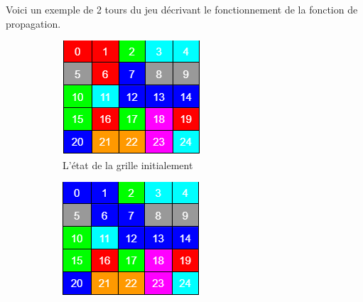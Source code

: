 \documentclass[11pt]{article}
\begin{document}
Voici un exemple de 2 tours du jeu décrivant le fonctionnement de la fonction de propagation. 
\begin{figure}[htp]

\begin{subfigure}{0.3\columnwidth}
\centering
\includegraphics[width=\textwidth]{img/iteration1.PNG}
\caption{L'état de la grille initialement}
\label{fig:time1}
\end{subfigure}\hfill
\begin{subfigure}{0.3\columnwidth}
\centering
\includegraphics[width=\textwidth]{img/iteration2.PNG}

\end{subfigure}
\end{figure}
\end{document}
